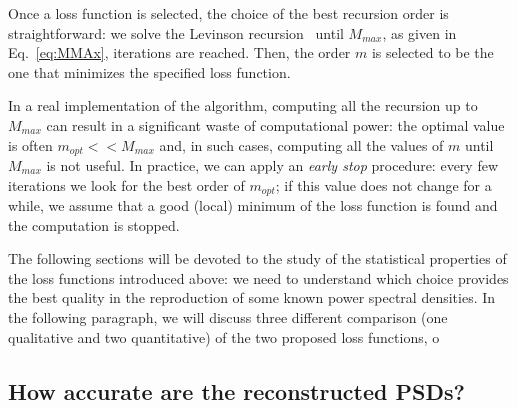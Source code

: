 \documentclass{aa}
\begin{document}
Once a loss function is selected, the choice of the best recursion order is straightforward: we solve the Levinson recursion~\citep{doi:10.1002/sapm1946251261} until $M_{max}$, as given in Eq.~\eqref{eq:MMAx}, iterations are reached. Then, the order $m$ is selected to be the one that minimizes the specified loss function.

In a real implementation of the algorithm, computing all the recursion up to $M_{max}$ can result in a significant waste of computational power: the optimal value is often $m_{opt} << M_{max}$ and, in such cases, computing all the values of $m$ until $M_{max}$ is not useful.
In practice, we can apply an \textit{early stop} procedure: every few iterations we look for the best order of $m_{opt}$; if this value does not change for a while, we assume that a good (local) minimum of the loss function is found and the computation is stopped.

The following sections will be devoted to the study of the statistical properties of the loss functions introduced above: we need to understand which choice provides the best quality in the reproduction of some known power spectral densities. In the following paragraph, we will discuss three different comparison (one qualitative and two quantitative) of the two proposed loss functions, o 
\subsection{How accurate are the reconstructed PSDs?}\label{sec:psd_validation}
\end{document}
